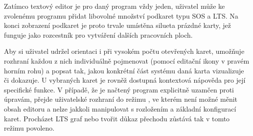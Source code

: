 Zatímco textový editor je pro daný program vždy jeden, uživatel může ke zvolenému programu přidat libovolné množství podkaret typu SOS a LTS. 
Na konci zobrazení podkaret je proto trvale umístěna silueta prázdné karty, jež funguje jako rozcestník pro vytváření dalších pracovních ploch. 

Aby si uživatel udržel orientaci i při vysokém počtu otevřených karet, umožňuje rozhraní každou z nich individuálně pojmenovat (pomocí editační ikony v pravém horním rohu) a popsat tak, jakou konkrétní část systému daná karta vizualizuje či dokazuje. 
U vybraných karet je rovněž dostupná kontextová nápověda pro její specifické funkce. 
V případě, že je načtený program explicitně uzamčen proti úpravám, přejde uživatelské rozhraní do režimu , ve kterém není možné měnit obsah editoru a nelze jakkoli manipulovat s rozložením a základní konfigurací karet.
Procházet LTS graf nebo tvořit důkaz přechodu zůstává tak v tomto režimu povoleno.

\endinput